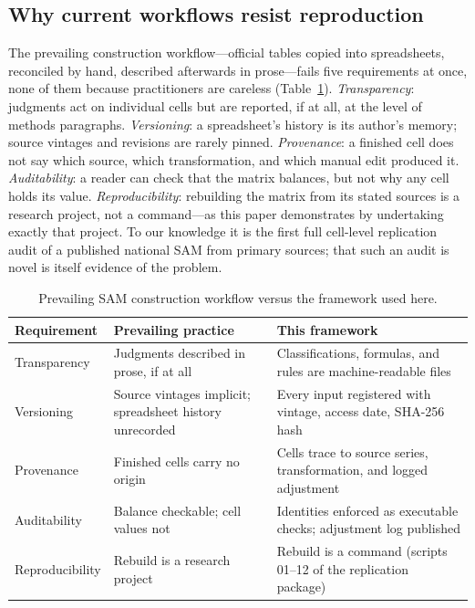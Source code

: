 \subsection{Why current workflows resist reproduction}
\label{sec:related:workflow}

The prevailing construction workflow---official tables copied into
spreadsheets, reconciled by hand, described afterwards in prose---fails
five requirements at once, none of them because practitioners are careless
(Table~\ref{tab:workflow}). \emph{Transparency}: judgments act on
individual cells but are reported, if at all, at the level of methods
paragraphs. \emph{Versioning}: a spreadsheet's history is its author's
memory; source vintages and revisions are rarely pinned.
\emph{Provenance}: a finished cell does not say which source, which
transformation, and which manual edit produced it. \emph{Auditability}: a
reader can check that the matrix balances, but not why any cell holds its
value. \emph{Reproducibility}: rebuilding the matrix from its stated
sources is a research project, not a command---as this paper demonstrates
by undertaking exactly that project. To our knowledge it is the first
full cell-level replication audit of a published national SAM from primary
sources; that such an audit is novel is itself evidence of the problem.

\begin{table}[ht]
\centering\small
\caption{Prevailing SAM construction workflow versus the framework used here.}
\label{tab:workflow}
\begin{tabularx}{\textwidth}{lXX}
\toprule
Requirement & Prevailing practice & This framework \\
\midrule
Transparency & Judgments described in prose, if at all & Classifications, formulas, and rules are machine-readable files \\
Versioning & Source vintages implicit; spreadsheet history unrecorded & Every input registered with vintage, access date, SHA-256 hash \\
Provenance & Finished cells carry no origin & Cells trace to source series, transformation, and logged adjustment \\
Auditability & Balance checkable; cell values not & Identities enforced as executable checks; adjustment log published \\
Reproducibility & Rebuild is a research project & Rebuild is a command (scripts 01--12 of the replication package) \\
\bottomrule
\end{tabularx}
\end{table}
